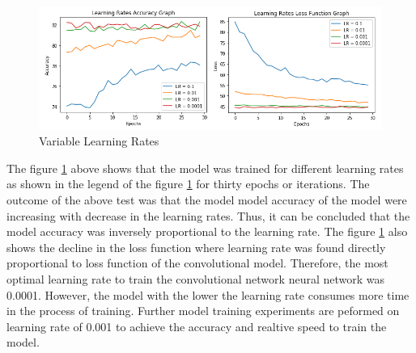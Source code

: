 \begin{figure}[!htp]
    \centering
    \includegraphics[width=15cm]{Images/lr.png}
    \caption{Variable Learning Rates}
    \label{fig:lrates}
\end{figure}

The figure \ref{fig:lrates} above shows that the model was trained for different learning rates as shown
in the legend of the figure \ref{fig:lrates} for thirty epochs or iterations. The outcome of the above test 
was that the model model accuracy of the model were increasing with decrease in the learning rates. Thus, it 
can be concluded that the model accuracy was  inversely proportional to the learning rate. The figure \ref{fig:lrates} also shows the 
decline in the loss function where learning rate was found directly proportional to loss function of the 
convolutional model. Therefore, the most optimal learning rate to train the convolutional network 
neural network was 0.0001. However, the model with the lower the learning rate consumes more time in the 
process of training. Further model training experiments are peformed on 
learning rate of 0.001 to achieve the accuracy and realtive speed to train the model.